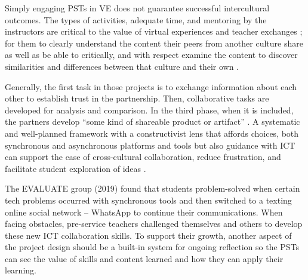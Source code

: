 Simply engaging PSTs in VE does not guarantee successful intercultural
outcomes. The types of activities, adequate time, and mentoring by the
instructors are critical to the value of virtual experiences and teacher
exchanges \cite{fuchs2022value}; for them to clearly understand
the content their peers from another culture share as well as be able to
critically, and with respect examine the content to discover
similarities and differences between that culture and their own \cite{roarty2021analysis}.
	
Generally, the first task in those projects is to exchange information
about each other to establish trust in the partnership. Then,
collaborative tasks are developed for analysis and comparison. In the
third phase, when it is included, the partners develop \enquote{some kind of
shareable product or artifact} \cite{godwin-jones2019telecollaboration}. A systematic and
well-planned framework with a constructivist lens that affords choices,
both synchronous and asynchronous platforms and tools but also guidance
with ICT can support the ease of cross-cultural collaboration, reduce
frustration, and facilitate student exploration of ideas \cite{calvo2023investigating,hauck2020approaches,kopish2020leveraging}.
		
The EVALUATE group (2019) found that students problem-solved when
certain tech problems occurred with synchronous tools and then switched
to a texting online social network -- WhatsApp to continue their
communications. When facing obstacles, pre-service teachers challenged
themselves and others to develop these new ICT collaboration skills. To
support their growth, another aspect of the project design should be a
built-in system for ongoing reflection so the PSTs can see the value of
skills and content learned and how they can apply their learning.
